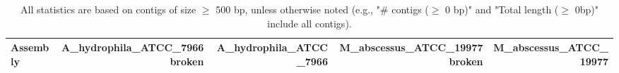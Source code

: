 \documentclass[12pt,a4paper]{article}
\begin{document}
\begin{table}[ht]
\begin{center}
\caption{All statistics are based on contigs of size $\geq$ 500 bp, unless otherwise noted (e.g., "\# contigs ($\geq$ 0 bp)" and "Total length ($\geq$ 0bp)" include all contigs).}
\begin{tabular}{|l*{4}{|r}|}
\hline
Assembly & A\_hydrophila\_ATCC\_7966 broken & A\_hydrophila\_ATCC\_7966 & M\_abscessus\_ATCC\_19977 broken & M\_abscessus\_ATCC\_19977 \\ \hline
\end{tabular}
\end{center}
\end{table}
\end{document}
